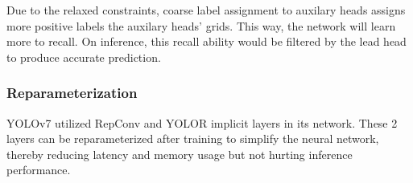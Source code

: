   Due to the relaxed constraints, coarse label assignment to auxilary heads assigns more positive labels the auxilary heads' grids. 
  This way, the network will learn more to recall.
  On inference, this recall ability would be filtered by the lead head to produce accurate prediction.
  \subsubsection{Reparameterization}
  YOLOv7 utilized RepConv and YOLOR implicit layers in its network.
  These 2 layers can be reparameterized after training to simplify the neural network, thereby reducing
  latency and memory usage but not hurting inference performance.
  
  


